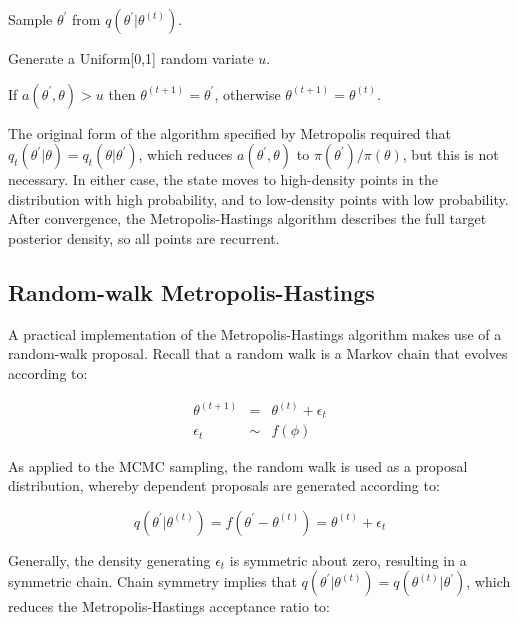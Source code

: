 \begin{list}{}
{}
\item Sample $\theta^{\prime}$ from $q(\theta^{\prime} | \theta^{(t)})$.
\item Generate a Uniform[0,1] random variate $u$.
\item If $a(\theta^{\prime},\theta) > u$ then $\theta^{(t+1)} = \theta^{\prime}$, otherwise $\theta^{(t+1)} = \theta^{(t)}$.
\end{list}

\noindent The original form of the algorithm specified by Metropolis required that $q_t(\theta^{\prime} | \theta) = q_t(\theta | \theta^{\prime})$, which reduces $a(\theta^{\prime},\theta)$ to $\pi(\theta^{\prime})/\pi(\theta)$, but this is not necessary. In either case, the state moves to high-density points in the distribution with high probability, and to low-density points with low probability. After convergence, the Metropolis-Hastings algorithm describes the full target posterior density, so all points are recurrent.


\hypertarget{random-walk-metropolis-hastings}{}
\subsection*{Random-walk Metropolis-Hastings}

A practical implementation of the Metropolis-Hastings algorithm makes use of a random-walk proposal. Recall that a random walk is a Markov chain that evolves according to:

\begin{eqnarray*}
\theta^{(t+1)} &=& \theta^{(t)} + \epsilon_t \\
\epsilon_t &\sim& f(\phi)
\end{eqnarray*}

As applied to the MCMC sampling, the random walk is used as a proposal distribution, whereby dependent proposals are generated according to:

\[
q(\theta^{\prime} | \theta^{(t)}) = f(\theta^{\prime} - \theta^{(t)}) = \theta^{(t)} + \epsilon_t
\]

Generally, the density generating $\epsilon_t$ is symmetric about zero, resulting in a symmetric chain. Chain symmetry implies that $q(\theta^{\prime} | \theta^{(t)}) = q(\theta^{(t)} | \theta^{\prime})$, which reduces the Metropolis-Hastings acceptance ratio to:


